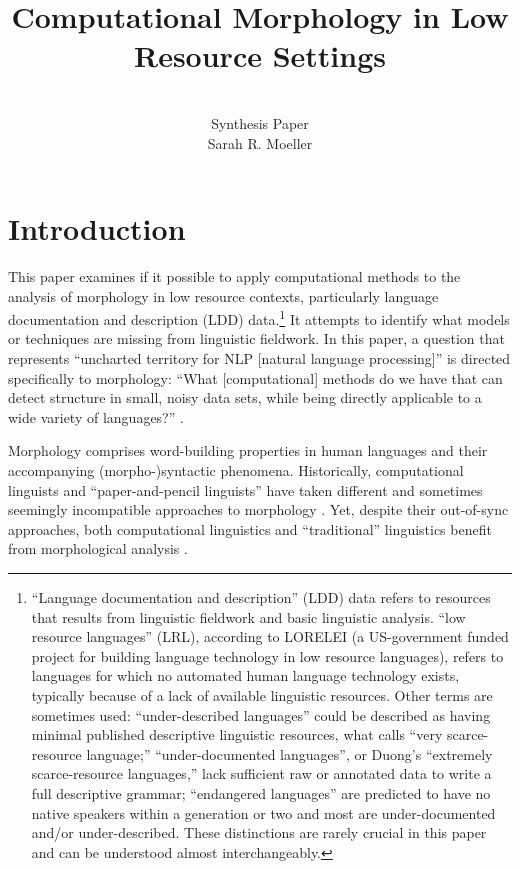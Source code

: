 \documentclass[12pt]{article}
\title{Computational Morphology in Low Resource Settings}
\author{\\Synthesis Paper \\ Sarah R. Moeller}
\date{}
\begin{document}
\maketitle

\section{Introduction}

 This paper examines if it possible to apply computational methods to the analysis of morphology in low resource contexts, particularly language documentation and description (LDD) data.\footnote{``Language documentation and description'' (LDD) data refers to resources that results from linguistic fieldwork and basic linguistic analysis. ``low resource languages'' (LRL), according to LORELEI (a US-government funded project for building language technology in low resource languages), refers to languages for which no automated human language technology exists, typically because of a lack of available linguistic resources. Other terms are sometimes used: ``under-described languages'' could be described as having minimal published descriptive linguistic resources, what  calls ``very scarce-resource language;'' ``under-documented languages'', or Duong's ``extremely scarce-resource languages,'' lack sufficient raw or annotated data to write a full descriptive grammar; ``endangered languages'' are predicted to have no native speakers within a generation or two and most are under-documented and/or under-described. These distinctions are rarely crucial in this paper and can be understood almost interchangeably.} It attempts to identify what models or techniques are missing from linguistic fieldwork. In this paper, a question that represents ``uncharted territory for NLP [natural language processing]'' is directed specifically to morphology: ``What [computational] methods do we have that can detect structure in small, noisy data sets, while being directly applicable to a wide variety of languages?'' \cite[page 472]{bird_natural_2009}. 

Morphology comprises word-building properties in human languages and their accompanying (morpho-)syntactic phenomena. Historically, computational linguists and ``paper-and-pencil linguists'' have taken different and sometimes seemingly incompatible approaches to morphology \cite[page 80]{karttunen_2005}.  Yet, despite their out-of-sync approaches, both computational linguistics and ``traditional'' linguistics benefit from morphological analysis \cite[page 165]{cotterell_labeled_2015}. 
\end{document}
